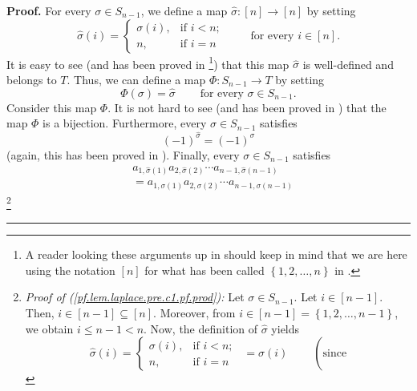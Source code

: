 \documentclass
[numbers=enddot,12pt,final,onecolumn,notitlepage,english]{scrartcl}%
\theoremstyle{definition}
\newenvironment{proof}[1][Proof]{\noindent\textbf{#1.} }{\ \rule{0.5em}{0.5em}}
\newenvironment{verlong}{}{}
\begin{document}
\begin{verlong}
\begin{proof}
For every $\sigma\in S_{n-1}$, we define a map $\widehat{\sigma}:\left[
n\right]  \rightarrow\left[  n\right]  $ by setting%
\[
\widehat{\sigma}\left(  i\right)  =%
\begin{cases}
\sigma\left(  i\right)  , & \text{if }i<n;\\
n, & \text{if }i=n
\end{cases}
\ \ \ \ \ \ \ \ \ \ \text{for every }i\in\left[  n\right]  .
\]
It is easy to see (and has been proved in \cite[proof of Lemma 6.44]%
{detnotes}\footnote{A reader looking these arguments up in \cite[proof of
Lemma 6.44]{detnotes} should keep in mind that we are here using the notation
$\left[  n\right]  $ for what has been called $\left\{  1,2,\ldots,n\right\}
$ in \cite[proof of Lemma 6.44]{detnotes}.}) that this map $\widehat{\sigma}$
is well-defined and belongs to $T$. Thus, we can define a map $\Phi
:S_{n-1}\rightarrow T$ by setting%
\[
\Phi\left(  \sigma\right)  =\widehat{\sigma}\ \ \ \ \ \ \ \ \ \ \text{for
every }\sigma\in S_{n-1}.
\]
Consider this map $\Phi$. It is not hard to see (and has been proved in
\cite[proof of Lemma 6.44]{detnotes}) that the map $\Phi$ is a bijection.
Furthermore, every $\sigma\in S_{n-1}$ satisfies%
\begin{equation}
\left(  -1\right)  ^{\widehat{\sigma}}=\left(  -1\right)  ^{\sigma}
\label{pf.lem.laplace.pre.c1.pf.-1}%
\end{equation}
(again, this has been proved in \cite[proof of Lemma 6.44]{detnotes}).
Finally, every $\sigma\in S_{n-1}$ satisfies%
\begin{align}
&  a_{1,\widehat{\sigma}\left(  1\right)  }a_{2,\widehat{\sigma}\left(
2\right)  }\cdots a_{n-1,\widehat{\sigma}\left(  n-1\right)  }\nonumber\\
&  =a_{1,\sigma\left(  1\right)  }a_{2,\sigma\left(  2\right)  }\cdots
a_{n-1,\sigma\left(  n-1\right)  } \label{pf.lem.laplace.pre.c1.pf.prod}%
\end{align}
\footnote{\textit{Proof of (\ref{pf.lem.laplace.pre.c1.pf.prod}):} Let
$\sigma\in S_{n-1}$. Let $i\in\left[  n-1\right]  $. Then, $i\in\left[
n-1\right]  \subseteq\left[  n\right]  $. Moreover, from $i\in\left[
n-1\right]  =\left\{  1,2,\ldots,n-1\right\}  $, we obtain $i\leq n-1<n$. Now,
the definition of $\widehat{\sigma}$ yields
\[
\widehat{\sigma}\left(  i\right)  =%
\begin{cases}
\sigma\left(  i\right)  , & \text{if }i<n;\\
n, & \text{if }i=n
\end{cases}
\ \ =\sigma\left(  i\right)  \ \ \ \ \ \ \ \ \ \ \left(  \text{since
}\]}
\end{proof}
\end{verlong}
\end{document}
